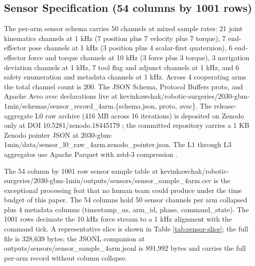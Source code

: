 \clearpage

\subsection{Sensor Specification (54 columns by 1001 rows)}
\label{sec:methods-sensors}

The per-arm sensor schema carries 50 channels at mixed sample rates:
21 joint kinematics channels at 1 kHz (7 position plus 7 velocity
plus 7 torque), 7 end-effector pose channels at 1 kHz (3 position
plus 4 scalar-first quaternion), 6 end-effector force and torque
channels at 10 kHz (3 force plus 3 torque), 3 navigation deviation
channels at 1 kHz, 7 tool flag and adjunct channels at 1 kHz, and 6
safety enumeration and metadata channels at 1 kHz. Across 4
cooperating arms the total channel count is 200. The JSON Schema,
Protocol Buffers proto, and Apache Avro avsc declarations live at
kevinkawchak/robotic-surgeries/2030-gbm-1min/schemas/sensor_record_4arm.\{schema.json, proto, avsc\}.
The release-aggregate L0 raw archive (416 MB across 16 iterations)
is deposited on Zenodo only at DOI 10.5281/zenodo.18445179
\cite{zenodo, repo-robotic-surgeries}; the committed repository
carries a 1 KB Zenodo pointer JSON at
2030-gbm-1min/data/sensor_l0_raw_4arm.zenodo_pointer.json. The L1
through L3 aggregates use Apache Parquet with zstd-3 compression
\cite{apache-arrow}.

The 54 column by 1001 row sensor sample table at
kevinkawchak/robotic-surgeries/2030-gbm-1min/outputs/sensors/sensor_sample_4arm.csv
is the exceptional processing feat that no human team could produce
under the time budget of this paper. The 54 columns hold 50 sensor
channels per arm collapsed plus 4 metadata columns (timestamp_us,
arm_id, phase, command_state). The 1001 rows decimate the 10 kHz
force stream to a 1 kHz alignment with the command tick. A
representative slice is shown in Table \ref{tab:sensor-slice}; the
full file is 328,639 bytes; the JSONL companion at
outputs/sensors/sensor_sample_4arm.jsonl is 891,992 bytes and
carries the full per-arm record without column collapse.

